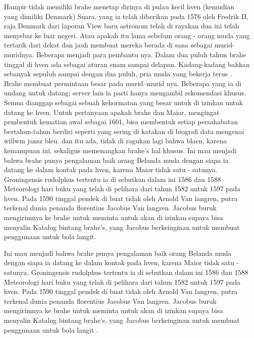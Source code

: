 Hampir tidak memiliki brahe menetap dirinya di pulau kecil hven (kemudian yang dimiliki Denmark) Suara, 
yang ia telah diberikan pada 1576 oleh Fredrik II, raja Denmark dari laporan View baru astronom telah di rayakan dua ini telah menyebar ke luar negeri. 
Atau apakah itu lama sebelum orang - orang muda yang tertarik dari dekat dan jauh membuat mereka berada di sana sebagai murid-muridnya. 
Beberapa menjadi para pembantu nya. Dalam dua puluh tahun brahe tinggal di hven ada sebagai aturan enam sampai delapan. 
Kadang-kadang bahkan sebanyak sepuluh sampai dengan dua puluh, pria muda yang bekerja terus . 
Brahe membuat permintaan besar pada murid–murid nya. Beberapa yang ia di undang untuk datang; server lain ia pasti hanya mengambil rekomendasi khusus. 
Semua dianggap sebagai sebuah kehormatan yang besar untuk di izinkan untuk datang ke hven. 
Untuk pertanyaan apakah brahe dan Maior, mengingat pembentuk kematian awal sebagai 1601, 
bisa membentuk setiap persahabatan bertahun-tahun berdiri seperti yang sering di katakan di biografi data mengenai willwm jansz bleu. 
dan itu ada, tidak di ragukan lagi bahwa blaen, karena kemampuan ini, sekaligus memenangkan brahe's hal khusus. 
Ini mau menjadi bahwa brahe punya pengalaman baik orang Belanda muda dengan siapa ia datang ke dalam kontak pada hven, 
karena Maior tidak satu - satunya. Groningensis rudolphus tertentu ia di sebutkan dalam ini 1586 dan 1588 Meteorologi 
hari buku yang telah di pelihara dari tahun 1582 untuk 1597 pada hven. 
Pada 1590 tinggal pendek di buat tidak oleh Arnold Van langren, 
putra terkenal dunia penanda florentius Jacobus Van langren. 
Jacobus buruk mengirimnya ke brahe untuk meminta untuk akan di izinkan supaya bisa menyalin Katalog bintang brahe's, 
yang Jacobus berkeinginan untuk membuat penggunaan untuk bola langit. 

Ini mau menjadi bahwa brahe punya pengalaman baik orang Belanda muda dengan siapa ia datang ke dalam kontak pada hven, 
karena Maior tidak satu - satunya. Groningensis rudolphus tertentu ia di sebutkan dalam ini 1586 dan 1588 Meteorologi 
hari buku yang telah di pelihara dari tahun 1582 untuk 1597 pada hven. 
Pada 1590 tinggal pendek di buat tidak oleh Arnold Van langren, 
putra terkenal dunia penanda florentius Jacobus Van langren. 
Jacobus buruk mengirimnya ke brahe untuk meminta untuk akan di izinkan supaya bisa menyalin Katalog bintang brahe's, 
yang Jacobus berkeinginan untuk membuat penggunaan untuk bola langit \cite{richter1939willem}.


